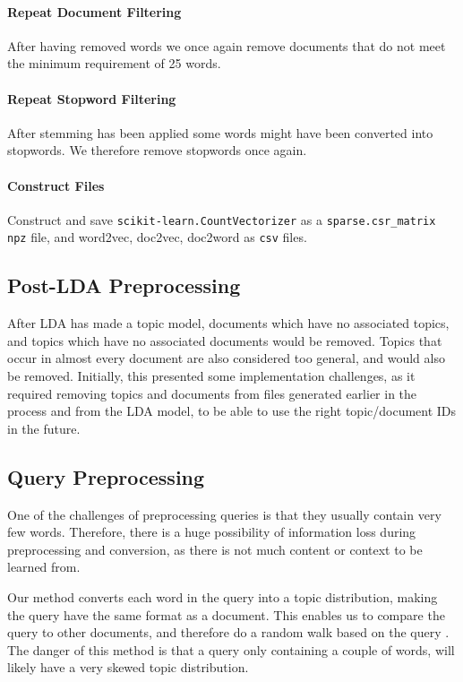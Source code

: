 \paragraph{Repeat Document Filtering}
After having removed words we once again remove documents that do not meet the minimum requirement of 25 words.

\paragraph{Repeat Stopword Filtering}
After stemming has been applied some words might have been converted into stopwords.
We therefore remove stopwords once again.


\paragraph{Construct Files}
Construct and save \texttt{scikit-learn.CountVectorizer} as a \texttt{sparse.csr\_matrix} \texttt{npz} file, and word2vec, doc2vec, doc2word as \texttt{csv} files.

\subsection{Post-LDA Preprocessing}
After LDA has made a topic model, documents which have no associated topics, and topics which have no associated documents would be removed.
Topics that occur in almost every document are also considered too general, and would also be removed. 
Initially, this presented some implementation challenges, as it required removing topics and documents from files generated earlier in the process and from the LDA model, to be able to use the right topic/document IDs in the future.

\subsection{Query Preprocessing}
One of the challenges of preprocessing queries is that they usually contain very few words.
Therefore, there is a huge possibility of information loss during preprocessing and conversion, as there is not much content or context to be learned from.

Our method converts each word in the query into a topic distribution, making the query have the same format as a document. 
This enables us to compare the query to other documents, and therefore do a random walk based on the query .
The danger of this method is that a query only containing a couple of words, will likely have a very skewed topic distribution.
